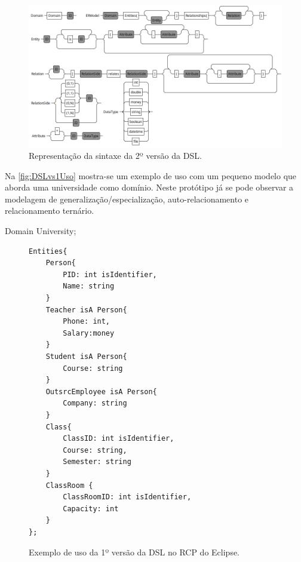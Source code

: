 \begin{figure} [!htb]
    \centering
    \caption{Representação da sintaxe da 2º versão da DSL.}
    \label{fig:ERDSL2Syntax}
    \includegraphics[width=\textwidth]{img/ERDSL2SyntaxGraph.png}
\end{figure}

Na \autoref{fig:DSLvs1Uso} mostra-se um exemplo de uso com um pequeno modelo que aborda uma universidade como domínio. 
Neste protótipo já se pode observar a modelagem de generalização/especialização, auto-relacionamento e relacionamento ternário.

Domain University;
\begin{figure}[!htb]
\centering
\caption{Exemplo de uso da 1º versão da DSL no RCP do Eclipse.}
\label{fig:DSLvs1Uso}
\begin{scriptsize}
\begin{lstlisting}[language = ERDSL, frame = trbl]
Entities{
	Person{ 
		PID: int isIdentifier, 
		Name: string
	}
	Teacher isA Person{ 
		Phone: int,
		Salary:money
	}
	Student isA Person{ 
		Course: string
	} 	
	OutsrcEmployee isA Person{
	    Company: string
	}
	Class{
		ClassID: int isIdentifier,
		Course: string,
		Semester: string
	}
	ClassRoom {
		ClassRoomID: int isIdentifier,
		Capacity: int
	}
};
\end{lstlisting}
\end{scriptsize}
\end{figure}

